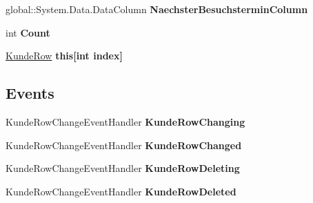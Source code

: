 \begin{DoxyCompactItemize}
\item 
global\+::\+System.\+Data.\+Data\+Column {\bfseries Naechster\+Besuchstermin\+Column}\hypertarget{class_products_1_1_data_1_1ds_sage_1_1_kunde_data_table_ad29b4ac74aca8d362393a87e7aee40ac}{}\label{class_products_1_1_data_1_1ds_sage_1_1_kunde_data_table_ad29b4ac74aca8d362393a87e7aee40ac}

\item 
int {\bfseries Count}\hypertarget{class_products_1_1_data_1_1ds_sage_1_1_kunde_data_table_ae5d1c87e7b58400b411f904cc8a74dd9}{}\label{class_products_1_1_data_1_1ds_sage_1_1_kunde_data_table_ae5d1c87e7b58400b411f904cc8a74dd9}

\item 
\hyperlink{class_products_1_1_data_1_1ds_sage_1_1_kunde_row}{Kunde\+Row} {\bfseries this\mbox{[}int index\mbox{]}}\hypertarget{class_products_1_1_data_1_1ds_sage_1_1_kunde_data_table_a96296c0ddb4238f18c90a5f1d3bc1d17}{}\label{class_products_1_1_data_1_1ds_sage_1_1_kunde_data_table_a96296c0ddb4238f18c90a5f1d3bc1d17}

\end{DoxyCompactItemize}
\subsection*{Events}
\begin{DoxyCompactItemize}
\item 
Kunde\+Row\+Change\+Event\+Handler {\bfseries Kunde\+Row\+Changing}\hypertarget{class_products_1_1_data_1_1ds_sage_1_1_kunde_data_table_a391760efc528b1b9dbde207ba02f1daa}{}\label{class_products_1_1_data_1_1ds_sage_1_1_kunde_data_table_a391760efc528b1b9dbde207ba02f1daa}

\item 
Kunde\+Row\+Change\+Event\+Handler {\bfseries Kunde\+Row\+Changed}\hypertarget{class_products_1_1_data_1_1ds_sage_1_1_kunde_data_table_ad6755b4c72d4b32e7bce42f5ee1d4a73}{}\label{class_products_1_1_data_1_1ds_sage_1_1_kunde_data_table_ad6755b4c72d4b32e7bce42f5ee1d4a73}

\item 
Kunde\+Row\+Change\+Event\+Handler {\bfseries Kunde\+Row\+Deleting}\hypertarget{class_products_1_1_data_1_1ds_sage_1_1_kunde_data_table_aec512751dc833ebed1d378b5aabcec6a}{}\label{class_products_1_1_data_1_1ds_sage_1_1_kunde_data_table_aec512751dc833ebed1d378b5aabcec6a}

\item 
Kunde\+Row\+Change\+Event\+Handler {\bfseries Kunde\+Row\+Deleted}\hypertarget{class_products_1_1_data_1_1ds_sage_1_1_kunde_data_table_adb5c2bb39648804d5f440b1137260d56}{}\label{class_products_1_1_data_1_1ds_sage_1_1_kunde_data_table_adb5c2bb39648804d5f440b1137260d56}

\end{DoxyCompactItemize}


